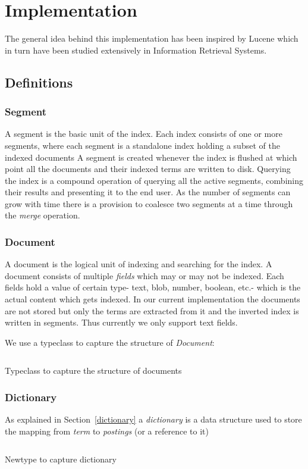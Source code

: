 \chapter{Implementation}
\label{chap:implementation}

The general idea behind this implementation has been inspired by Lucene\cite{goetz2000lucene}
which in turn have been studied extensively in Information Retrieval Systems.

\section{Definitions}

\subsection{Segment}
A segment is the basic unit of the index.
Each index consists of one or more segments, where each segment is a standalone index holding a subset of the indexed documents\cite{mccandless2010lucene}
A segment is created whenever the index is flushed at which point all the documents and their indexed terms are written to disk.
Querying the index is a compound operation of querying all the active segments, combining their results and presenting it to the end user.
As the number of segments can grow with time there is a provision to coalesce two segments at a time through the \textit{merge} operation.

\subsection{Document}
A document is the logical unit of indexing and searching for the index.
A document consists of multiple \textit{fields} which may or may not be indexed.
Each fields hold a value of certain type- text, blob, number, boolean, etc.- which is the actual content which gets indexed.
In our current implementation the documents are not stored but only the terms are extracted from it and the inverted index is written in segments.
Thus currently we only support text fields.

We use a typeclass to capture the structure of \textit{Document}:
\begin{listing}
\inputminted{haskell}{hs/document.hs}
\caption{Typeclass to capture the structure of documents}
\end{listing}

\subsection{Dictionary}
As explained in Section~\ref{dictionary} a \textit{dictionary} is a data structure used to store the mapping from \textit{term} to \textit{postings} (or a reference to it)
\begin{listing}
\inputminted{haskell}{hs/dictionary.hs}
\caption{Newtype to capture dictionary}
\end{listing}


